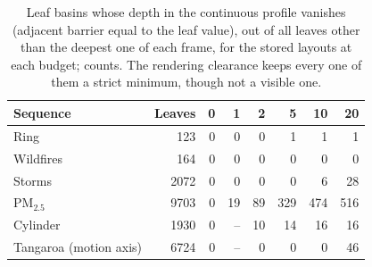 \begin{table}[!htb]
\centering
\caption{Leaf basins whose depth in the continuous profile vanishes (adjacent barrier equal to the leaf value), out of all leaves other than the deepest one of each frame, for the stored layouts at each budget; counts. The rendering clearance keeps every one of them a strict minimum, though not a visible one.}
\label{tab:depth}
\footnotesize
\setlength{\tabcolsep}{3pt}
\begin{tabular}{@{}lrrrrrrr@{}}
\toprule
Sequence & Leaves & 0 & 1 & 2 & 5 & 10 & 20 \\
\midrule
Ring & 123 & 0 & 0 & 0 & 1 & 1 & 1 \\
Wildfires & 164 & 0 & 0 & 0 & 0 & 0 & 0 \\
Storms & 2072 & 0 & 0 & 0 & 0 & 6 & 28 \\
PM$_{2.5}$ & 9703 & 0 & 19 & 89 & 329 & 474 & 516 \\
Cylinder & 1930 & 0 & -- & 10 & 14 & 16 & 16 \\
Tangaroa (motion axis) & 6724 & 0 & -- & 0 & 0 & 0 & 46 \\
\bottomrule
\end{tabular}
\end{table}
